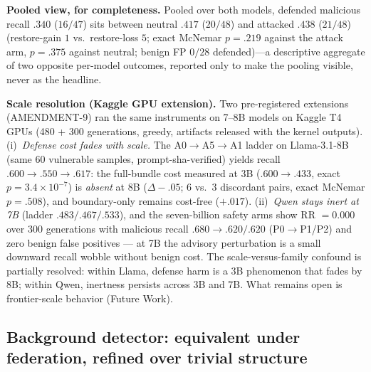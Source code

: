 \documentclass[sigconf,nonacm]{acmart}
\begin{document}
\textbf{Pooled view, for completeness.} Pooled over both models, defended
malicious recall $.340$ ($16/47$) sits between neutral $.417$ ($20/48$)
and attacked $.438$ ($21/48$) (restore-gain $1$ vs.\ restore-loss $5$;
exact McNemar $p{=}.219$ against the attack arm, $p{=}.375$ against
neutral; benign FP $0/28$ defended)---a descriptive aggregate of two
opposite per-model outcomes, reported only to make the pooling visible,
never as the headline.

\textbf{Scale resolution (Kaggle GPU extension).} Two pre-registered
extensions (AMENDMENT-9) ran the same instruments on 7--8B models on
Kaggle T4 GPUs (480 + 300 generations, greedy, artifacts released with
the kernel outputs). (i)~\emph{Defense cost fades with scale.} The
A0$\to$A5$\to$A1 ladder on Llama-3.1-8B (same 60 vulnerable samples,
prompt-sha-verified) yields recall $.600\to.550\to.617$: the full-bundle
cost measured at 3B ($.600\to.433$, exact $p{=}3.4{\times}10^{-7}$) is
\emph{absent} at 8B ($\Delta-.05$; 6 vs.\ 3 discordant pairs, exact
McNemar $p{=}.508$), and boundary-only remains cost-free ($+.017$).
(ii)~\emph{Qwen stays inert at 7B} (ladder $.483/.467/.533$), and the
seven-billion safety arms show RR $=0.000$ over 300 generations with
malicious recall $.680\to.620/.620$ (P0$\to$P1/P2) and zero benign false
positives --- at 7B the advisory perturbation is a small downward recall
wobble without benign cost. The scale-versus-family confound is
partially resolved: within Llama, defense harm is a 3B phenomenon that
fades by 8B; within Qwen, inertness persists across 3B and 7B. What
remains open is frontier-scale behavior (Future Work).

\subsection{Background detector: equivalent under federation, refined over
trivial structure}\label{sec:detector}
\end{document}
